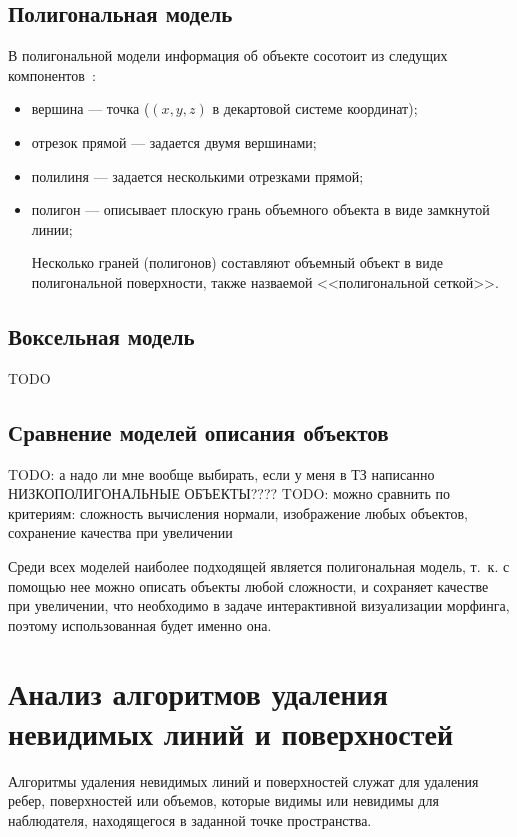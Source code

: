     \subsection{Полигональная модель}
    В полигональной модели информация об объекте сосотоит из следущих компонентов~\cite{porev}:
    \begin{itemize}
	\item вершина --- точка ($(x, y, z)$ в декартовой системе координат);
	\item отрезок прямой --- задается двумя вершинами;
	\item полилиня --- задается несколькими отрезками прямой;
	\item полигон --- описывает плоскую грань объемного объекта в виде замкнутой линии;
	
	Несколько граней (полигонов) составляют объемный объект в виде полигональной поверхности, также назваемой <<полигональной сеткой>>.
    \end{itemize}
    
    \subsection{Воксельная модель}
    TODO
    
    \subsection{Сравнение моделей описания объектов}
    TODO: а надо ли мне вообще выбирать, если у меня в ТЗ написанно НИЗКОПОЛИГОНАЛЬНЫЕ ОБЪЕКТЫ????
    TODO: можно сравнить по критериям: сложность вычисления нормали, изображение любых объектов, сохранение качества при увеличении
    
    Среди всех моделей наиболее подходящей является полигональная модель, т.~к. с помощью нее можно описать объекты любой сложности, и сохраняет качестве при увеличении, что необходимо в задаче интерактивной визуализации морфинга,  поэтому использованная будет именно она.
    
    \section{Анализ алгоритмов удаления невидимых линий и поверхностей}
    
    Алгоритмы удаления невидимых линий и поверхностей служат для удаления ребер, поверхностей или объемов, которые видимы или невидимы для наблюдателя, находящегося в заданной точке пространства\cite{rogers}.
    
